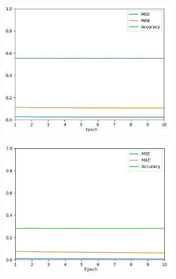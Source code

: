 \documentclass{cys}
\begin{document}
\begin{figure}[h]
	\centering
	\begin{subfigure}{0.32\textwidth} 
		\includegraphics[width=\textwidth]{img/pilotnet1}
		\label{subfig:1}
	\end{subfigure}
	\begin{subfigure}{0.32\textwidth} 
		\includegraphics[width=\textwidth]{img/pilotnet2}
		\label{subfig:2}
	\end{subfigure}
	\begin{subfigure}{0.32\textwidth} 

\end{subfigure}
\end{figure}
\end{document}

